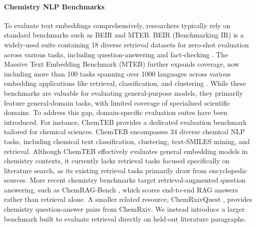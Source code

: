 \documentclass[twoside,twocolumn,9pt]{article}
\begin{document}
\paragraph*{Chemistry NLP Benchmarks} To evaluate text embeddings comprehensively, researchers typically rely on standard benchmarks such as BEIR and MTEB. BEIR (Benchmarking IR) is a widely-used suite containing 18 diverse retrieval datasets for zero-shot evaluation across various tasks, including question-answering and fact-checking \cite{thakur2021beir}. The Massive Text Embedding Benchmark (MTEB) further expands coverage, now including more than 100 tasks spanning over 1000 languages \cite{mteb_website} across various embedding applications like retrieval, classification, and clustering \cite{muennighoff2022mteb}. While these benchmarks are valuable for evaluating general-purpose models, they primarily feature general-domain tasks, with limited coverage of specialized scientific domains. To address this gap, domain-specific evaluation suites have been introduced. For instance, ChemTEB \cite{pmlr-v262-shiraee-kasmaee24a} provides a dedicated evaluation benchmark tailored for chemical sciences. ChemTEB encompasses 34 diverse chemical NLP tasks, including chemical text classification, clustering, text-SMILES mining, and retrieval. Although ChemTEB effectively evaluates general embedding models in chemistry contexts, it currently lacks retrieval tasks focused specifically on literature search, as its existing retrieval tasks primarily draw from encyclopedic sources. More recent chemistry benchmarks target retrieval-augmented question answering, such as ChemRAG-Bench \cite{zhong2025benchmarking}, which scores end-to-end RAG answers rather than retrieval alone. A smaller related resource, ChemRxivQuest \cite{amiri2025chemrxivquest}, provides chemistry question-answer pairs from ChemRxiv. We instead introduce a larger benchmark built to evaluate retrieval directly on held-out literature paragraphs.
\end{document}
